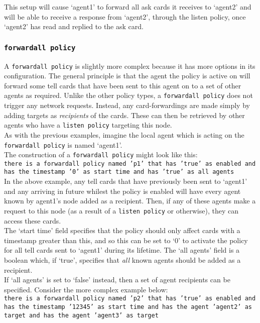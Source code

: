 \documentclass{scrartcl}
\begin{document}
This setup will cause `agent1' to forward all ask cards it receives to `agent2' and will be able to receive a response from `agent2', through the listen policy, once `agent2' has read and replied to the ask card.

\subsubsection{\texttt{forwardall policy}}
A \texttt{forwardall policy} is slightly more complex because it has more options in its configuration. The general principle is that the agent the policy is active on will forward some tell cards that have been sent to this agent on to a set of other agents as required. Unlike the other policy types, a \texttt{forwardall policy} does not trigger any network requests. Instead, any card-forwardings are made simply by adding targets as \textit{recipients} of the cards. These can then be retrieved by other agents who have a \texttt{listen policy} targeting this node.\\

As with the previous examples, imagine the local agent which is acting on the \texttt{forwardall policy} is named `agent1'.\\

The construction of a \texttt{forwardall policy} might look like this:\\
\texttt{there is a forwardall policy named 'p1' that has 'true' as enabled and has the timestamp '0' as start time and has 'true' as all agents}\\

In the above example, any tell cards that have previously been sent to `agent1' and any arriving in future whilest the policy is enabled will have every agent known by agent1's node added as a recipient. Then, if any of these agents make a request to this node (as a result of a \texttt{listen policy} or otherwise), they can access these cards.\\

The `start time' field specifies that the policy should only affect cards with a timestamp greater than this, and so this can be set to `0' to activate the policy for all tell cards sent to `agent1' during its lifetime. The `all agents' field is a boolean which, if `true', specifies that \textit{all} known agents should be added as a recipient.\\

If `all agents' is set to `false' instead, then a set of agent recipients can be specified. Consider the more complex example below:\\
\texttt{there is a forwardall policy named 'p2' that has 'true' as enabled and has the timestamp '12345' as start time and has the agent 'agent2' as target and has the agent 'agent3' as target}\\
\end{document}
